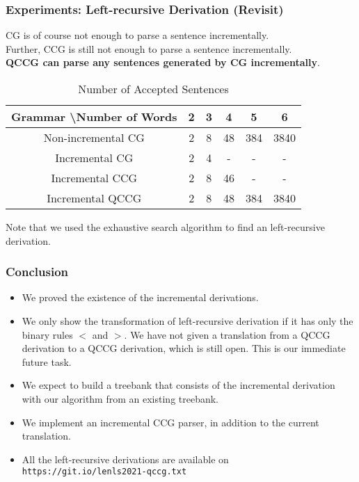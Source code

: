 \documentclass[aspectratio=169]{beamer}
\begin{document}
\begin{frame}[t]
	\frametitle{Experiments: Left-recursive Derivation (Revisit)}
	CG is of course not enough to parse a sentence incrementally. \\
	Further, CCG is still not enough to parse a sentence incrementally. \\
	\textbf{QCCG can parse any sentences generated by CG incrementally}.
	\begin{table}[htpb]
		\centering
		\caption{Number of Accepted Sentences}
		\label{tab:icg-iccg-iqccg}
		\begin{tabular}{c|ccccc}
			Grammar \textbackslash Number of Words & 2 & 3 & 4  & 5   & 6    \\
			\hline\hline
			Non-incremental CG                     & 2 & 8 & 48 & 384 & 3840 \\
			\hline
			Incremental CG                         & 2 & 4 & -  & -   & -    \\
			Incremental CCG                        & 2 & 8 & 46 & -   & -    \\
			Incremental QCCG                       & 2 & 8 & 48 & 384 & 3840 \\
		\end{tabular}
	\end{table}
	\alert{
		Note that we used the exhaustive search algorithm to find an left-recursive derivation.
	}
\end{frame}
\begin{frame}[t]
	\frametitle{Conclusion}
	\begin{itemize}
		\item We proved the existence of the incremental derivations.
		\item We only show the transformation of left-recursive derivation if it has only the binary rules \(<\) and \(>\). We have not given a translation from a QCCG derivation to a QCCG derivation, which is still open. This is our immediate future task.
		\item We expect to build a treebank that consists of the incremental derivation with our algorithm from an existing treebank.
		\item We implement an incremental CCG parser, in addition to  the current translation.
		\item All the left-recursive derivations are available on \texttt{https://git.io/lenls2021-qccg.txt}
	\end{itemize}
\end{frame}
\end{document}
